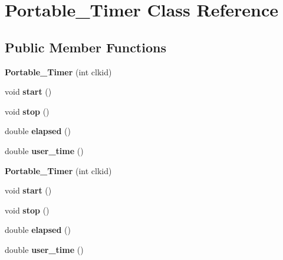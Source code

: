 \hypertarget{class_portable___timer}{}\section{Portable\+\_\+\+Timer Class Reference}
\label{class_portable___timer}
\subsection*{Public Member Functions}
\begin{DoxyCompactItemize}
\item 
\mbox{\label{class_portable___timer_a61283c45d3e1179ffc0c171862024742}} 
{\bfseries Portable\+\_\+\+Timer} (int clkid)
\item 
\mbox{\label{class_portable___timer_a3843c362d5e39dcb15e25f5d79cbe109}} 
void {\bfseries start} ()
\item 
\mbox{\label{class_portable___timer_a810bbe10973b2f269039257959d2ba31}} 
void {\bfseries stop} ()
\item 
\mbox{\label{class_portable___timer_a44a60bdc20a615fafbad111b94a90aed}} 
double {\bfseries elapsed} ()
\item 
\mbox{\label{class_portable___timer_a0d22c34809814614d0a70b19c1ae78e6}} 
double {\bfseries user\+\_\+time} ()
\item 
\mbox{\label{class_portable___timer_a61283c45d3e1179ffc0c171862024742}} 
{\bfseries Portable\+\_\+\+Timer} (int clkid)
\item 
\mbox{\label{class_portable___timer_a3843c362d5e39dcb15e25f5d79cbe109}} 
void {\bfseries start} ()
\item 
\mbox{\label{class_portable___timer_a810bbe10973b2f269039257959d2ba31}} 
void {\bfseries stop} ()
\item 
\mbox{\label{class_portable___timer_a44a60bdc20a615fafbad111b94a90aed}} 
double {\bfseries elapsed} ()
\item 
\mbox{\label{class_portable___timer_a0d22c34809814614d0a70b19c1ae78e6}} 
double {\bfseries user\+\_\+time} ()
\end{DoxyCompactItemize}


